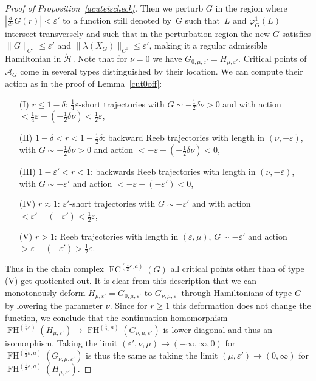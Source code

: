 \documentclass{amsart}
\newcommand{\Acal}{{\mathcal{A}}}
\newcommand{\Hcal}{{\mathcal{H}}}
\newcommand{\FH}{\operatorname{FH}}
\newcommand{\FC}{\operatorname{FC}}
\theoremstyle{definition}
\theoremstyle{remark}
\numberwithin{equation}{section}
\begin{document}
\begin{proof}[Proof of Proposition~\ref{acuteischeck}]
\noindent Then we perturb $G$ in the region where $|\frac{d}{dr}G(r)|<\varepsilon'$ to a function still denoted by~$G$ such that~$L$ and $\varphi_G^1(L)$ intersect transversely and such that in the perturbation region the new $G$ satisfies $\|G\|_{C^0}\leq \varepsilon'$ and $\|\lambda(X_G)\|_{C^0}\leq\varepsilon'$, making it a regular admissible Hamiltonian in $\acute\Hcal$. Note that for $\nu=0$ we have $G_{0,\mu,\varepsilon'}=H_{\mu,\varepsilon'}$. Critical points of $\Acal_G$ come in several types distinguished by their location. We can compute their action as in the proof of Lemma~\ref{cut0off}:
\begin{itemize}
	\item[(I)] $r\leq1-\delta$: $\frac14\varepsilon$-short trajectories with $G\sim-\frac12\delta\nu>0$ and with action $<\frac14\varepsilon-(-\frac12\delta\nu)<\frac12\varepsilon$,
	\item[(II)] $1-\delta<r<1-\frac12\delta$: backward Reeb trajectories with length in $(\nu,-\varepsilon)$, with $G\sim-\frac12\delta\nu>0$ and action $<-\varepsilon-(-\frac12\delta\nu)<0$,
	\item[(III)] $1-\varepsilon'<r<1$: backwards Reeb trajectories with length in $(\nu,-\varepsilon)$, with $G\sim-\varepsilon'$ and action $<-\varepsilon-(-\varepsilon')<0$,
	\item[(IV)] $r\approx1$: $\varepsilon'$-short trajectories with $G\sim-\varepsilon'$ and with action $<\varepsilon'-(-\varepsilon')<\frac12\varepsilon$,
	\item[(V)] $r>1$: Reeb trajectories with length in $(\varepsilon,\mu)$, $G\sim-\varepsilon'$ and action $>\varepsilon-(-\varepsilon')>\frac12\varepsilon$.
\end{itemize}
Thus in the chain complex $\FC^{(\frac12\varepsilon,a)}(G)$ all critical points other than of type (V) get quotiented out. It is clear from this description that we can monotonously deform $H_{\mu,\varepsilon'}=G_{0,\mu,\varepsilon'}$ to $G_{\nu,\mu,\varepsilon'}$ through Hamiltonians of type $G$ by lowering the parameter $\nu$. Since for $r\geq1$ this deformation does not change the function, we conclude that the continuation homomorphism $\FH^{(\frac12\varepsilon)}(H_{\mu,\varepsilon'})\to\FH^{(\frac12,a)}(G_{\nu,\mu,\varepsilon'})$ is lower diagonal and thus an isomorphism. Taking the limit $(\varepsilon',\nu,\mu)\to(-\infty,\infty,0)$ for $\FH^{(\frac12\varepsilon,a)}(G_{\nu,\mu,\varepsilon'})$  is thus the same as taking the limit $(\mu,\varepsilon')\to(0,\infty)$ for $\FH^{(\frac12\varepsilon,a)}(H_{\mu,\varepsilon'})$.


\end{proof}
\end{document}
